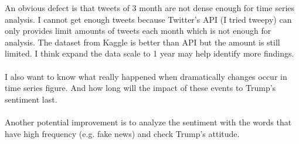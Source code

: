 \documentclass{article}
\begin{document}
An obvious defect is that tweets of 3 month are not dense enough for time series analysis. I cannot get enough tweets because Twitter's API (I tried tweepy) can only provides limit amounts of tweets each month which is not enough for analysis. The dataset from Kaggle is better than API but the amount is still limited. I think expand the data scale to 1 year may help identify more findings.
\\ \hspace*{\fill} \\
I also want to know what really happened when dramatically changes occur in time series figure. And how long will the impact of these events to Trump's sentiment last.
\\ \hspace*{\fill} \\
Another potential improvement is to analyze the sentiment with the words that have high frequency (e.g. fake news) and check Trump's attitude.
\end{document}
